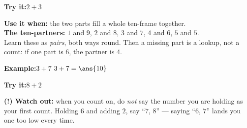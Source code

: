 \documentclass[12pt]{article}
\begin{document}
\begin{tryitbox}
\textbf{Try it:}\quad $2 + 3$\\[2pt]
\end{tryitbox}


\begin{formulabox}
\textbf{Use it when:} the two parts fill a whole ten-frame together.\\[3pt]
\textbf{The ten-partners:} $1$ and $9$, \; $2$ and $8$, \; $3$ and $7$, \;
$4$ and $6$, \; $5$ and $5$.\\[3pt]
Learn these as \emph{pairs}, both ways round. Then a missing part is a
lookup, not a count: if one part is $6$, the partner is $4$.
\end{formulabox}

\begin{examplebox}
\textbf{Example:}\quad $3 + 7$
$3 + 7 = \ans{10}$
\end{examplebox}

\begin{tryitbox}
\textbf{Try it:}\quad $8 + 2$\\[2pt]
\end{tryitbox}

\begin{watchoutbox}
\textbf{(!) Watch out:} when you count on, do \emph{not} say the number you are
holding as your first count. Holding $6$ and adding $2$, say ``$7$, $8$'' ---
saying ``$6$, $7$'' lands you one too low every time.
\end{watchoutbox}
\end{document}
